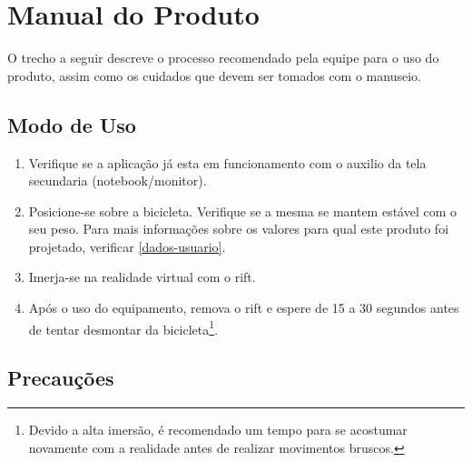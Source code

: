 \chapter{Manual do Produto} %
\label{cha:manual_do_produto}
 
O trecho a seguir descreve o processo recomendado pela equipe para o uso do produto, assim como os cuidados que devem ser tomados com o manuseio.

\section{Modo de Uso} %
\label{sec:modo_de_uso}

\begin{enumerate}
	\item Verifique se a aplicação já esta em funcionamento com o auxilio da tela secundaria (notebook/monitor).
	\item Posicione-se sobre a bicicleta. Verifique se a mesma se mantem  estável com o seu peso. Para mais informações sobre os valores para qual este produto foi projetado, verificar \autoref{dados-usuario}.
	\item Imerja-se na realidade virtual com o \gls{rift}.
	\item Após o uso do equipamento, remova o \gls{rift} e espere de 15 a 30 segundos antes de tentar desmontar da bicicleta\footnote{Devido a alta imersão, é recomendado um tempo para se acostumar novamente com a realidade antes de realizar movimentos bruscos.}.
\end{enumerate}

\section{Precauções} %
\label{sec:precau_es}

